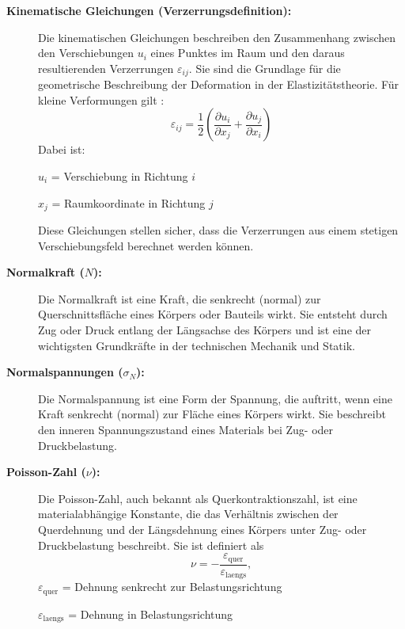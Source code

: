 \begin{description}
	\item[\textbf{Kinematische Gleichungen (Verzerrungsdefinition):}] Die kinematischen Gleichungen beschreiben den Zusammenhang zwischen den Verschiebungen $u_i$ eines Punktes im Raum und den daraus resultierenden Verzerrungen $\varepsilon_{ij}$. 
	Sie sind die Grundlage für die geometrische Beschreibung der Deformation in der Elastizitätstheorie. 
	Für kleine Verformungen gilt \cite{elastomechanik:Technische_Mechanik_2:Elastostatik}:
	\begin{equation}
		\varepsilon_{ij} = 
		\frac{1}{2} \left( \frac{\partial u_i}{\partial x_j} + \frac{\partial u_j}{\partial x_i} \right)
	\end{equation}
	Dabei ist:
	
	$u_i$ = Verschiebung in Richtung $i$
	
	$x_j$ = Raumkoordinate in Richtung $j$
	
	Diese Gleichungen stellen sicher, dass die Verzerrungen aus einem stetigen Verschiebungsfeld berechnet werden können.
	
	\item[\textbf{Normalkraft ($N$):}] Die Normalkraft ist eine Kraft, die senkrecht (normal) zur Querschnittsfläche eines Körpers oder Bauteils wirkt. 
	Sie entsteht durch Zug oder Druck entlang der Längsachse des Körpers und ist eine der wichtigsten Grundkräfte in der technischen Mechanik und Statik.
	
	\item[\textbf{Normalspannungen ($\sigma_N$):}] Die Normalspannung ist eine Form der Spannung, die auftritt, wenn eine Kraft senkrecht (normal) zur Fläche eines Körpers wirkt. 
	Sie beschreibt den inneren Spannungszustand eines Materials bei Zug- oder Druckbelastung.
	
	\item[\textbf{Poisson-Zahl ($\nu$):}] Die Poisson-Zahl, auch bekannt als Querkontraktionszahl, ist eine materialabhängige Konstante, die das Verhältnis zwischen der Querdehnung und der Längsdehnung eines Körpers unter Zug- oder Druckbelastung beschreibt.
	Sie ist definiert als
	\begin{equation}
		\nu=
		-\frac{\varepsilon_\text{quer}}{\varepsilon_\text{laengs}},
	\end{equation}
	$\varepsilon_\text{quer}$ = Dehnung senkrecht zur Belastungsrichtung
	
	$\varepsilon_\text{laengs}$ = Dehnung in Belastungsrichtung
	

\end{description}
